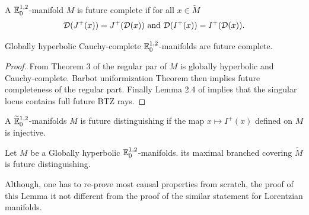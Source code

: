 \begin{defi}\label{def:manifold_future_complete_all}
 A $\mathbb{E}^{1,2}_0$-manifold $M$ is future complete if for all $x\in \widetilde M$ 
 $$ \mathcal{D}(J^+(x)) = J^+(\mathcal{D}(x)) \text{ and }  \mathcal{D}(I^+(x)) = I^+(\mathcal{D}(x)).$$
\end{defi}

\begin{prop}\label{prop:globally_hyperbolic_cauchy_complete_manifolds} Globally hyperbolic Cauchy-complete $\mathbb{E}^{1,2}_0$-manifolds are future complete.
\end{prop}
\begin{proof}
From Theorem 3 of \cite{brunswic2021cauchy} the regular par of $M$ is globally hyperbolic and Cauchy-complete. Barbot uniformization Theorem  \cite{barbot_globally_2004} then implies future completeness of the regular part. 
Finally Lemma 2.4 of \cite{brunswic2021cauchy} implies that the singular locus contains full future BTZ rays.
\end{proof}


\begin{defi}\label{def:manifolds_future_distinguishing_map_2} A ${\widetilde {\mathbb{E}}}^{1,2}_0$-manifolds $M$ is future distinguishing if the map $x\mapsto I^+(x)$ defined on $M$ is injective.
\end{defi}

\begin{lem}\label{lem:globally_hyperbolic_manifolds_maximal} Let $M$ be a Globally hyperbolic $\mathbb{E}^{1,2}_0$-manifolds. its maximal branched covering $\widetilde M$ is future distinguishing.
\end{lem}
Although, one has to re-prove most causal properties from scratch, the proof of this Lemma it not different from the proof of the similar statement for Lorentzian manifolds. 

